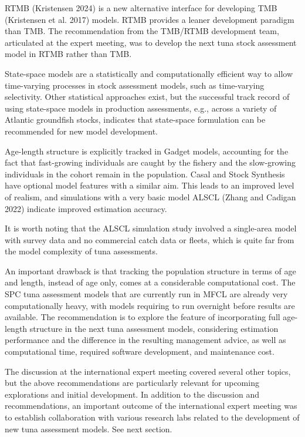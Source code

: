 \documentclass{SCreport}
\begin{document}
RTMB (Kristensen 2024) is a new alternative interface for developing TMB
(Kristensen et al. 2017) models. RTMB provides a leaner development paradigm
than TMB. The recommendation from the TMB/RTMB development team, articulated at
the expert meeting, was to develop the next tuna stock assessment model in RTMB
rather than TMB.

State-space models are a statistically and computationally efficient way to
allow time-varying processes in stock assessment models, such as time-varying
selectivity. Other statistical approaches exist, but the successful track record
of using state-space models in production assessments, e.g., across a variety of
Atlantic groundfish stocks, indicates that state-space formulation can be
recommended for new model development.

Age-length structure is explicitly tracked in Gadget models, accounting for the
fact that fast-growing individuals are caught by the fishery and the
slow-growing individuals in the cohort remain in the population. Casal and Stock
Synthesis have optional model features with a similar aim. This leads to an
improved level of realism, and simulations with a very basic model ALSCL (Zhang
and Cadigan 2022) indicate improved estimation accuracy.

It is worth noting that the ALSCL simulation study involved a single-area model
with survey data and no commercial catch data or fleets, which is quite far from
the model complexity of tuna assessments.

An important drawback is that tracking the population structure in terms of age
and length, instead of age only, comes at a considerable computational cost. The
SPC tuna assessment models that are currently run in MFCL are already very
computationally heavy, with models requiring to run overnight before results are
available. The recommendation is to explore the feature of incorporating full
age-length structure in the next tuna assessment models, considering estimation
performance and the difference in the resulting management advice, as well as
computational time, required software development, and maintenance cost.

The discussion at the international expert meeting covered several other topics,
but the above recommendations are particularly relevant for upcoming
explorations and initial development. In addition to the discussion and
recommendations, an important outcome of the international expert meeting was to
establish collaboration with various research labs related to the development of
new tuna assessment models. See next section.
\end{document}
